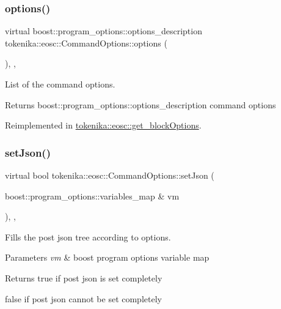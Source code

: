 \subsubsection{\texorpdfstring{options()}{options()}}
{\footnotesize\ttfamily virtual boost\+::program\+\_\+options\+::options\+\_\+description tokenika\+::eosc\+::\+Command\+Options\+::options (\begin{DoxyParamCaption}{ }\end{DoxyParamCaption})\hspace{0.3cm}{\ttfamily [inline]}, {\ttfamily [protected]}, {\ttfamily [virtual]}}



List of the command options. 

\begin{DoxyReturn}{Returns}
boost\+::program\+\_\+options\+::options\+\_\+description command options 
\end{DoxyReturn}


Reimplemented in \hyperlink{classtokenika_1_1eosc_1_1get__block_options_a4071310fa888b0e7184648bd62e6eb41}{tokenika\+::eosc\+::get\+\_\+block\+Options}.

\mbox{\label{classtokenika_1_1eosc_1_1_command_options_a7aecc9aa79ca65f6abbd568ff8ff77a7}} 
\subsubsection{\texorpdfstring{set\+Json()}{setJson()}}
{\footnotesize\ttfamily virtual bool tokenika\+::eosc\+::\+Command\+Options\+::set\+Json (\begin{DoxyParamCaption}\item[{boost\+::program\+\_\+options\+::variables\+\_\+map \&}]{vm }\end{DoxyParamCaption})\hspace{0.3cm}{\ttfamily [inline]}, {\ttfamily [protected]}, {\ttfamily [virtual]}}



Fills the post json tree according to options. 


\begin{DoxyParams}{Parameters}
{\em vm} & boost program options variable map \\
\hline
\end{DoxyParams}
\begin{DoxyReturn}{Returns}
true if post json is set completely 

false if post json cannot be set completely 
\end{DoxyReturn}


